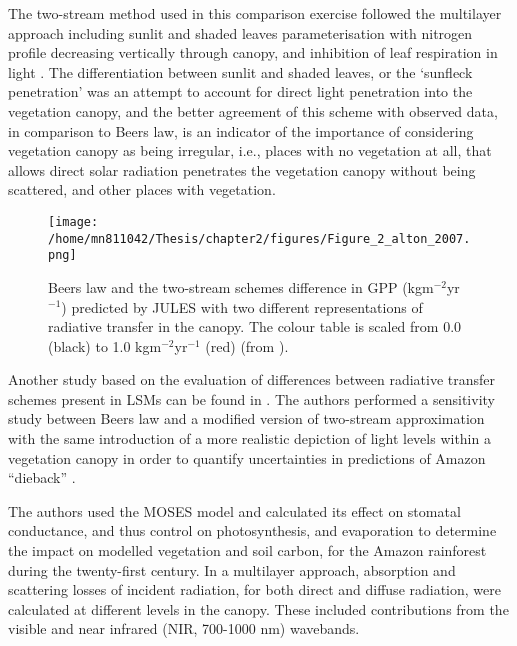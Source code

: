 The two-stream method used in this comparison exercise followed the multilayer approach including sunlit and shaded leaves parameterisation with nitrogen profile decreasing vertically through canopy, and inhibition of leaf respiration in light \citep{Mercado2007}. The differentiation between sunlit and shaded leaves, or the `sunfleck penetration' \citep{Dai2004} was an attempt to account for direct light penetration into the vegetation canopy, and the better agreement of this scheme with observed data, in comparison to Beer\textquotesingle s law, is an indicator of the importance of considering vegetation canopy as being irregular, i.e., places with no vegetation at all, that allows direct solar radiation penetrates the vegetation canopy without being scattered, and other places with vegetation.

\begin{figure}[ht!]
\centering
\texttt{[image: /home/mn811042/Thesis/chapter2/figures/Figure\_2\_alton\_2007.png]}
\caption{Beer\textquotesingle s law and the two-stream schemes difference in GPP (kgm$^{-2}$yr$^{-1}$) predicted by JULES with two different representations of radiative transfer in the canopy. The colour table is scaled from 0.0 (black) to 1.0 kgm$^{-2}$yr$^{-1}$ (red) (from \citet{Alton2007}).}
\label{f:gpp_difference_beers}
\end{figure}

Another study based on the evaluation of differences between radiative transfer schemes present in LSMs can be found in \citet{Huntingford2008}. The authors performed a sensitivity study between Beer\textquotesingle s law and a modified version of two-stream approximation with the same introduction of a more realistic depiction of light levels within a vegetation canopy \citep{Jogireddy2006,Mercado2007} in order to quantify uncertainties in predictions of Amazon ``dieback'' \citep{Cox2000}. 

The authors used the MOSES \citep{Cox1999} model and calculated its effect on stomatal conductance, and thus control on photosynthesis, and evaporation to determine the impact on modelled vegetation and soil carbon, for the Amazon rainforest during the twenty-first century. In a multilayer approach, absorption and scattering losses of incident radiation, for both direct and diffuse radiation, were calculated at different levels in the canopy. These included contributions from the visible and near infrared (NIR, 700-1000 nm) wavebands.

